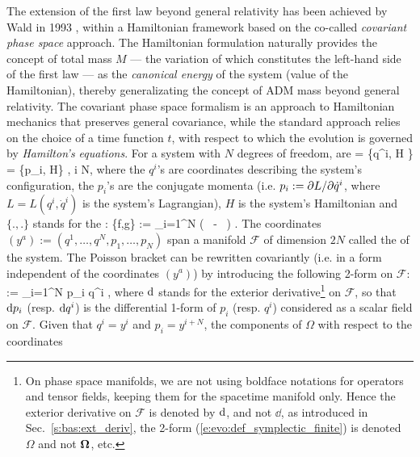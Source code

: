 The extension of the first law beyond general relativity has been achieved
by Wald in 1993 \cite{Wald93}, within a Hamiltonian
framework based on the co-called \emph{covariant phase space} approach. The Hamiltonian formulation naturally provides the concept
of total mass $M$ --- the variation of which constitutes the left-hand side of the first law --- as the \emph{canonical energy} of the system (value of the Hamiltonian),
thereby generalizating the concept of ADM mass beyond general relativity.
The covariant phase space formalism is an approach to Hamiltonian mechanics that
preserves general covariance, while the standard approach relies on the choice of
a time function $t$, with respect to which the evolution is governed by
\emph{Hamilton's equations}. For a system with $N$ degrees of freedom,
 are
\be \label{e:evo_Hamilton_eqs_finite}
     = \{q^i, H \} \qand {} = \{p_i, H\} ,  \leq i \leq N,
\ee
where the $q^i$'s are coordinates describing the system's configuration,
the $p_i$'s are the conjugate momenta (i.e. $p_i := {\partial L}/{\partial {\dot q}^i}$, where
$L = L(q^i,{\dot q}^i)$ is the system's Lagrangian),
$H$ is the system's Hamiltonian
and $\{.,.\}$
stands for the :
\be \label{e:evo:Poisson_bracket_canon}
 \{f,g\} := \sum_{i=1}^N \left(  \,  -  \,  \right) .
\ee
The coordinates $(y^a) := (q^1,\ldots,q^N,p_1,\ldots,p_N)$ span a manifold $\mathcal{F}$ of dimension
$2N$ called the  of the system.
The Poisson bracket can be rewritten covariantly (i.e. in a form independent of the
coordinates $(y^a)$) by introducing the following 2-form on $\mathcal{F}$:
\be \label{e:evo:def_symplectic_finite}
    \Omega := \sum_{i=1}^N \Dd p_i \wedge \Dd q^i ,
\ee
where $\mathrm{d}$ stands for the exterior derivative\footnote{On phase space manifolds, we are
not using boldface notations for operators and tensor fields, keeping them for the spacetime
manifold only. Hence the exterior derivative on $\mathcal{F}$ is denoted by $\mathrm{d}$, and not
$\dd$, as introduced in Sec.~\ref{s:bas:ext_deriv}, the 2-form (\ref{e:evo:def_symplectic_finite}) is denoted $\Omega$ and not $\bm{\Omega}$, etc.}
 on $\mathcal{F}$,
so that $\mathrm{d} p_i$ (resp. $\mathrm{d} q^i$) is the differential 1-form of $p_i$
(resp. $q^i$) considered as a scalar field on $\mathcal{F}$.
Given that $q^i = y^i$ and $p_i = y^{i+N}$,
the components of $\Omega$ with respect to the coordinates
